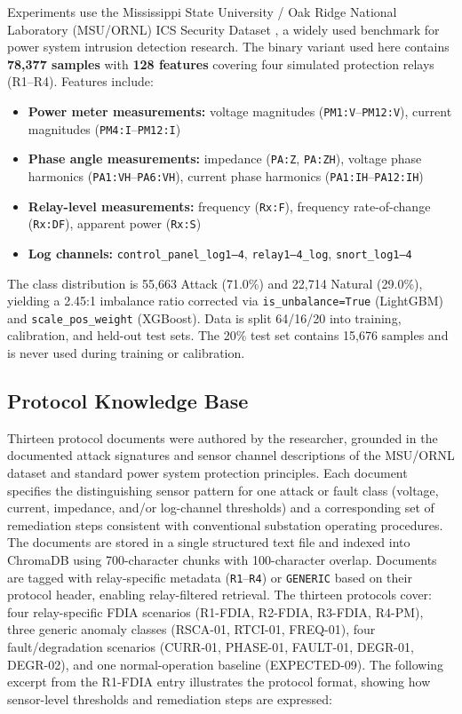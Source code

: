 \documentclass[twocolumn, 10pt, letterpaper]{article}
\begin{document}
Experiments use the Mississippi State University / Oak Ridge National Laboratory
(MSU/ORNL) ICS Security Dataset \cite{morris2014ics},
a widely used benchmark for power system intrusion detection research.
The binary variant used here contains \textbf{78,377 samples} with \textbf{128 features}
covering four simulated protection relays (R1--R4).
Features include:
\begin{itemize}
    \item \textbf{Power meter measurements:} voltage magnitudes (\texttt{PM1:V}--\texttt{PM12:V}), current magnitudes (\texttt{PM4:I}--\texttt{PM12:I})
    \item \textbf{Phase angle measurements:} impedance (\texttt{PA:Z}, \texttt{PA:ZH}), voltage phase harmonics (\texttt{PA1:VH}--\texttt{PA6:VH}), current phase harmonics (\texttt{PA1:IH}--\texttt{PA12:IH})
    \item \textbf{Relay-level measurements:} frequency (\texttt{Rx:F}), frequency rate-of-change (\texttt{Rx:DF}), apparent power (\texttt{Rx:S})
    \item \textbf{Log channels:} \texttt{control\_panel\_log1--4}, \texttt{relay1--4\_log}, \texttt{snort\_log1--4}
\end{itemize}
The class distribution is 55,663 Attack (71.0\%) and 22,714 Natural (29.0\%),
yielding a 2.45:1 imbalance ratio corrected via
\texttt{is\_unbalance=True} (LightGBM) and \texttt{scale\_pos\_weight} (XGBoost).
Data is split 64/16/20 into training, calibration, and held-out test sets.
The 20\% test set contains 15,676 samples and is never used during training or calibration.

\subsection{Protocol Knowledge Base}

Thirteen protocol documents were authored by the researcher, grounded in the
documented attack signatures and sensor channel descriptions of the MSU/ORNL
dataset \cite{morris2014ics} and standard power system protection principles.
Each document specifies the distinguishing sensor pattern for one attack or fault
class (voltage, current, impedance, and/or log-channel thresholds) and a
corresponding set of remediation steps consistent with conventional substation
operating procedures.
The documents are stored in a single structured text file and indexed into
ChromaDB using 700-character chunks with 100-character overlap.
Documents are tagged with relay-specific metadata (\texttt{R1}--\texttt{R4})
or \texttt{GENERIC} based on their protocol header, enabling relay-filtered retrieval.
The thirteen protocols cover: four relay-specific FDIA scenarios (R1-FDIA, R2-FDIA,
R3-FDIA, R4-PM), three generic anomaly classes (RSCA-01, RTCI-01, FREQ-01),
four fault/degradation scenarios (CURR-01, PHASE-01, FAULT-01, DEGR-01, DEGR-02),
and one normal-operation baseline (EXPECTED-09).
The following excerpt from the R1-FDIA entry illustrates the protocol format,
showing how sensor-level thresholds and remediation steps are expressed:
\end{document}
